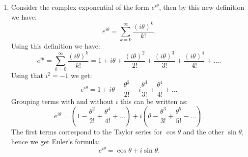 \begin{enumerate}
\item Consider the complex exponential of the form $e^{i\theta}$, then by this new definition we have:
$$e^{i\theta}=\sum_{k=0}^{\infty}\frac{(i\theta)^{k}}{k!}.$$
Using this definition we have:
$$e^{i\theta}=\sum_{k=0}^{\infty}\frac{(i\theta)^{k}}{k!}=1 + i\theta + \frac{(i\theta)^{2}}{2!} + \frac{(i\theta)^{3}}{3!} + \frac{(i\theta)^{4}}{4!} + \hdots.$$
Using that $i^{2}=-1$ we get:
$$e^{i\theta}=1+i\theta-\frac{\theta^{2}}{2!}-i\frac{\theta^{3}}{3!}+\frac{\theta^{4}}{4!}+\hdots$$
Grouping terms with and without $i$ this can be written as:
$$e^{i\theta}=(1-\frac{\theta^{2}}{2!}+\frac{\theta^{4}}{4!}+\hdots)+i(\theta-\frac{\theta^{3}}{3!}+\frac{\theta^{5}}{5!}-\hdots).$$
The first terms correspond to the Taylor series for $\cos \theta$ and the other $\sin \theta$, hence we get Euler's formula:
$$e^{i\theta}=\cos\theta+i\sin\theta.$$

\end{enumerate}